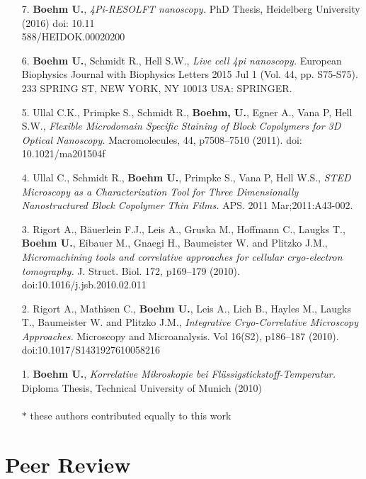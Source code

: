 \documentclass[margin,line]{res}
\begin{document}
\begin{resume}
\begin{enumerate}[leftmargin=*]
\item[7.] {\bf Boehm U.},  {\it 4Pi-RESOLFT nanoscopy.} PhD Thesis, Heidelberg University (2016) doi: 10.11\\588/HEIDOK.00020200

\item[6.] {\bf Boehm U.}, Schmidt R., Hell S.W., {\it Live cell 4pi nanoscopy.} European Biophysics Journal with Biophysics Letters 2015 Jul 1 (Vol. 44, pp. S75-S75). 233 SPRING ST, NEW YORK, NY 10013 USA: SPRINGER.

\item[5.] Ullal C.K., Primpke S., Schmidt R., {\bf Boehm, U.}, Egner A., Vana P, Hell S.W., {\it Flexible Microdomain Specific Staining of Block Copolymers for 3D Optical Nanoscopy.} Macromolecules, 44, p7508–7510 (2011). doi: 10.1021/ma201504f

\item[4.] Ullal C., Schmidt R., {\bf  Boehm U.}, Primpke S., Vana P, Hell W.S.,  {\it STED Microscopy as a Characterization Tool for Three Dimensionally Nanostructured Block Copolymer Thin Films.} APS. 2011 Mar;2011:A43-002.

\item[3.] Rigort A., Bäuerlein F.J., Leis A., Gruska M., Hoffmann C., Laugks T., {\bf Boehm U.}, Eibauer M., Gnaegi H., Baumeister W. and Plitzko J.M.,  {\it Micromachining tools and correlative approaches for cellular cryo-electron tomography.} J. Struct. Biol. 172, p169–179 (2010). doi:10.1016/j.jsb.2010.02.011

\item[2.] Rigort A., Mathisen C., {\bf Boehm U.}, Leis A., Lich B., Hayles M., Laugks T., Baumeister W. and Plitzko J.M.,  {\it Integrative Cryo-Correlative Microscopy Approaches.}
Microscopy and Microanalysis. Vol 16(S2), p186–187 (2010). doi:10.1017/S1431927610058216 

\item[1.]{\bf Boehm U.},  {\it Korrelative Mikroskopie bei Flüssigstickstoff-Temperatur.} Diploma Thesis, Technical University of Munich (2010)  \\ \\
$*$ these authors contributed equally to this work

\end{enumerate}


\section{\sc Peer Review} 


\end{resume}
\end{document}
